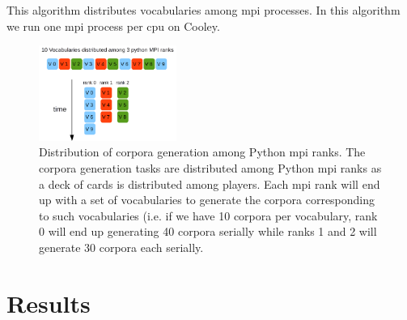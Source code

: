 \documentclass[11pt,a4paper]{article}
\begin{document}
\begin{algorithm}
	\caption{This algorithm distributes vocabularies among \gls{mpi} processes. In this algorithm we run one \gls{mpi} process per \gls{cpu} on Cooley.}
\label{corpora_generation_parallelization}
\begin{algorithmic}[1]
			\ENDFOR
		\ENDIF
	\ENDFOR
\end{algorithmic}
\end{algorithm}

\begin{figure}[h!]
    \centering
    \includegraphics[width=0.4\textwidth]{CorporaGenerationParallelization.png}
    \caption{Distribution of corpora generation among Python \gls{mpi} ranks. The corpora generation tasks are distributed among Python \gls{mpi} ranks as a deck of cards is distributed among players. Each \gls{mpi} rank will end up with a set of vocabularies to generate the corpora corresponding to such vocabularies (i.e. if we have 10 corpora per vocabulary, rank 0 will end up generating 40 corpora serially while ranks 1 and 2 will generate 30 corpora each serially.}
    \label{fig:CorporaGenerationParallelization}
\end{figure}
























\section{Results}
\end{document}
